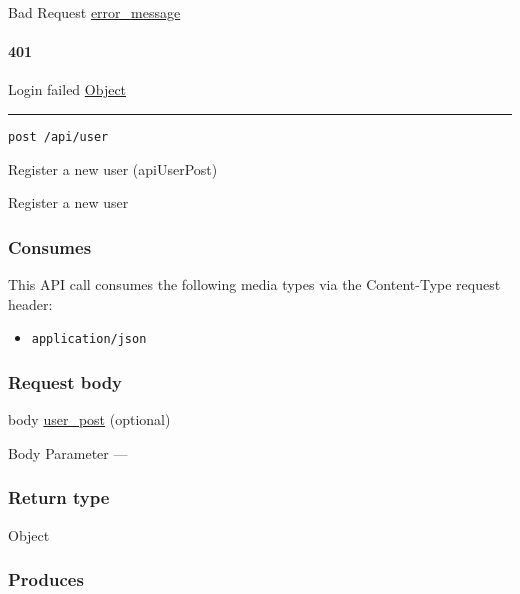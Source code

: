 Bad Request \protect\hyperlink{error_message}{error\_message}

\hypertarget{section-25}{%
\paragraph{401}\label{section-25}}

Login failed \protect\hyperlink{Object}{Object}

\begin{center}\rule{0.5\linewidth}{\linethickness}\end{center}

\protect\hypertarget{apiUserPost}{}{}

\begin{verbatim}
post /api/user
\end{verbatim}

Register a new user ({apiUserPost})

Register a new user

\hypertarget{consumes-3}{%
\subsubsection{Consumes}\label{consumes-3}}

This API call consumes the following media types via the {Content-Type}
request header:

\begin{itemize}
\tightlist
\item
  \texttt{application/json}
\end{itemize}

\hypertarget{request-body-3}{%
\subsubsection{Request body}\label{request-body-3}}

body \protect\hyperlink{user_post}{user\_post} (optional)

{Body Parameter} ---

\hypertarget{return-type-6}{%
\subsubsection{Return type}\label{return-type-6}}

Object

\hypertarget{produces-8}{%
\subsubsection{Produces}\label{produces-8}}

